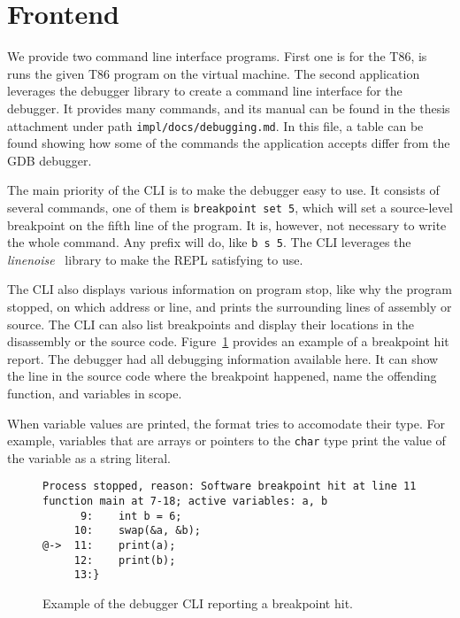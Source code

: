 \section{Frontend}
We provide two command line interface programs. First one is for the T86, is
runs the given T86 program on the virtual machine. The second application
leverages the debugger library to create a command line interface for the
debugger. It provides many commands, and its manual can be found in the thesis
attachment under path \texttt{impl/docs/debugging.md}. In this file, a table
can be found showing how some of the commands the application accepts differ
from the GDB debugger.

The main priority of the CLI is to make the debugger easy to use. It consists
of several commands, one of them is \texttt{breakpoint set 5}, which will set a
source-level breakpoint on the fifth line of the program. It is, however, not
necessary to write the whole command. Any prefix will do, like \texttt{b s 5}.
The CLI leverages the \textit{linenoise}~\cite{linenoise} library to make the
REPL satisfying to use.

The CLI also displays various information on program stop, like why the program
stopped, on which address or line, and prints the surrounding lines of assembly
or source. The CLI can also list breakpoints and display their locations in the
disassembly or the source code. Figure~\ref{fig:cli-hit} provides an example of
a breakpoint hit report. The debugger had all debugging information available
here. It can show the line in the source code where the breakpoint happened,
name the offending function, and variables in scope.

When variable values are printed, the format tries to accomodate their type.
For example, variables that are arrays or pointers to the \texttt{char} type
print the value of the variable as a string literal.

\begin{figure}
    \begin{lstlisting}
Process stopped, reason: Software breakpoint hit at line 11
function main at 7-18; active variables: a, b
      9:    int b = 6;
     10:    swap(&a, &b);
@->  11:    print(a);
     12:    print(b);
     13:}
    \end{lstlisting}
    \caption{Example of the debugger CLI reporting a breakpoint hit.}
    \label{fig:cli-hit}
\end{figure}
